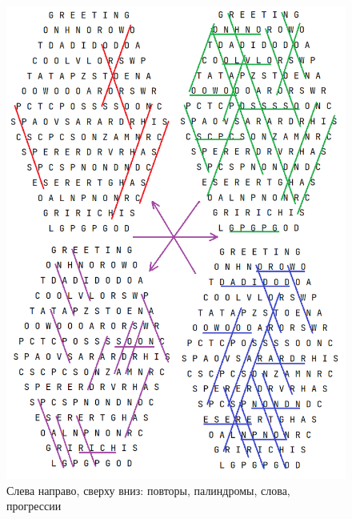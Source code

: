 \documentclass[12pt]{report}
\begin{document}
\begin{figure}[p!]
 \centering
    \includegraphics[scale=0.9]{patterns.png}
    \caption{\label{pic:Patterns}Слева направо, сверху вниз: повторы, палиндромы, слова, прогрессии}
\end{figure}
\end{document}
